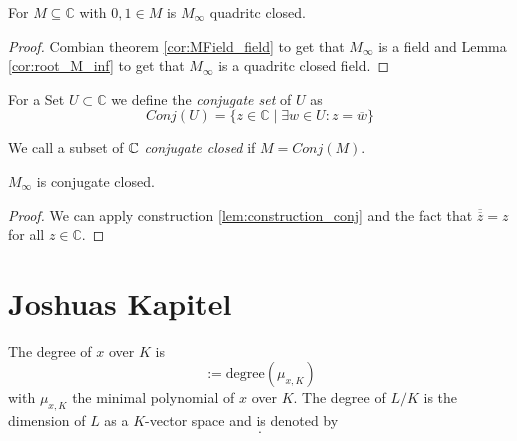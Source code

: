 \begin{lemma}
    \label{lem:M_inf_quad_closed}
    For $M\subseteq \mathbb{C}$ with $0,1 \in M$ is $M_{\infty}$ quadritc closed.
\end{lemma}
\begin{proof}
    Combian theorem \ref{cor:MField_field} to get that $M_{\infty}$ is a field and Lemma \ref{cor:root_M_inf} to get that $M_{\infty}$ is a quadritc closed field.
\end{proof}

\begin{definition}
    \label{def:conjugate_set}
    \leanok
    For a Set $U \subset \mathbb{C}$ we define the \emph{conjugate set} of $U$ as 
    \begin{equation*}
        Conj(U) = \{z\in \mathbb{C} \mid \exists w\in U: z = \overline{w}\}
    \end{equation*}
\end{definition}

\begin{definition}
    \label{def:conj_closed}
    \leanok
    We call a subset of $\mathbb{C}$ \emph{conjugate closed} if $M= Conj(M)$.
\end{definition}

\begin{lemma}
    \label{lem:conj_MField}
    \leanok
    $M_{\infty}$ is conjugate closed.
\end{lemma}
\begin{proof}
    We can apply construction \ref{lem:construction_conj} and the fact that $\overline{\overline z} = z$ for all $z \in\mathbb{C}$.
\end{proof}


\section{Joshuas Kapitel}

\begin{definition}
    The degree of $x$ over $K$ is
    \begin{equation*}
        [x:K] :=\text{degree}(\mu_{x,K})
        \end{equation*}
        with $\mu_{x,K}$ the minimal polynomial of $x$ over $K$. \newline
    The degree of $L/K$ is the dimension of $L$ as a $K$-vector space and is denoted by
    \begin{equation*}
        [L:K].
    \end{equation*}
\end{definition}

